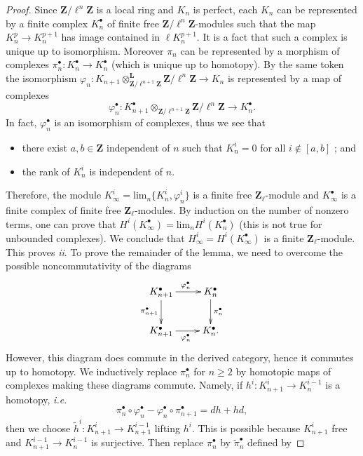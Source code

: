 \begin{proof}
Since $\mathbf{Z}/\ell^n\mathbf{Z}$ is a local ring and $K_n$ is perfect, each $K_n$ can be represented by a finite complex $K_n^\bullet$ of finite free $\mathbf{Z}/\ell^n \mathbf{Z}$-modules such that the map $K_n^p \to K_n^{p+1}$ has image contained in $\ell K_n^{p+1}$. It is a fact that such a complex is unique up to isomorphism. Moreover $\pi_n$ can be represented by a morphism of complexes $\pi_n^\bullet: K_n^\bullet\to K_n^\bullet$ (which is unique up to homotopy). By the same token the isomorphism $\varphi_n:K_{n+1}\otimes_{\mathbf{Z}/\ell^{n+1}\mathbf{Z}}^{\mathbf{L}} \mathbf{Z}/\ell^n\mathbf{Z}\to K_n$ is represented by a map of complexes
$$
\varphi_n^\bullet: K_{n+1}^\bullet\otimes_{\mathbf{Z}/\ell^{n+1}\mathbf{Z}}\mathbf{Z}/\ell^n\mathbf{Z}\to K_n^\bullet.
$$
In fact, $\varphi_n^\bullet$ is an isomorphism of complexes, thus we see that 
\begin{itemize}
\item
there exist $a, b\in \mathbf{Z}$ independent of $n$ such that $K_n^i = 0$ for all $i\notin[a, b]$ ; and 
\item 
the rank of $K_n^i$ is independent of $n$.
\end{itemize}	
Therefore, the module $K_\infty^i = \text{lim}_n \{K_n^i, \varphi_n^i\}$ is a finite free $\mathbf{Z}_\ell$-module and $K_\infty^\bullet$ is a finite complex of finite free $\mathbf{Z}_\ell$-modules. By induction on the number of nonzero terms, one can prove that $H^i\left(K_\infty^\bullet\right) = \text{lim}_n H^i\left(K_n^\bullet\right)$ (this is not true for unbounded complexes). We conclude that $H_\infty^i = H^i\left(K_\infty^\bullet\right)$ is a finite $\mathbf{Z}_\ell$-module. This proves {\it ii}. To prove the remainder of the lemma, we need to overcome the possible noncommutativity of the diagrams
$$
\xymatrix{
{K_{n+1}^\bullet} \ar_{\pi_{n+1}^\bullet}[d] \ar^{\varphi_n^\bullet}[r] & {K_n^\bullet} \ar^{\pi_n^\bullet}[d] \\
{K_{n+1}^\bullet} \ar_{\varphi_n^\bullet}[r] & {K_n^\bullet.}
}
$$
However, this diagram does commute in the derived category, hence it commutes up to homotopy. We inductively replace $\pi_n^\bullet$ for $n\geq 2$ by homotopic maps of complexes making these diagrams commute. Namely, if $h^i: K_{n+1}^i \to K_n^{i-1}$ is a homotopy, {\it i.e.}
$$
\pi_n^\bullet\circ\varphi_n^\bullet-\varphi_n^\bullet\circ\pi_{n+1}^\bullet = dh+hd,
$$
then we choose $\tilde h^i: K_{n+1}^i\to K_{n+1}^{i-1}$ lifting $h^i$. This is possible because $K_{n+1}^i$ free and $K_{n+1}^{i-1}\to K_n^{i-1}$ is surjective. Then replace $\pi_n^\bullet$ by $\tilde\pi_n^\bullet$ defined by 

\end{proof}
